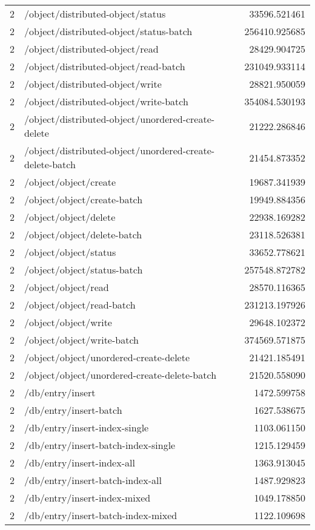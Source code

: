 \begin{longtable}{rlr}
2 & /object/distributed-object/status & 33596.521461 \\
2 & /object/distributed-object/status-batch & 256410.925685 \\
2 & /object/distributed-object/read & 28429.904725 \\
2 & /object/distributed-object/read-batch & 231049.933114 \\
2 & /object/distributed-object/write & 28821.950059 \\
2 & /object/distributed-object/write-batch & 354084.530193 \\
2 & /object/distributed-object/unordered-create-delete & 21222.286846 \\
2 & /object/distributed-object/unordered-create-delete-batch & 21454.873352 \\
2 & /object/object/create & 19687.341939 \\
2 & /object/object/create-batch & 19949.884356 \\
2 & /object/object/delete & 22938.169282 \\
2 & /object/object/delete-batch & 23118.526381 \\
2 & /object/object/status & 33652.778621 \\
2 & /object/object/status-batch & 257548.872782 \\
2 & /object/object/read & 28570.116365 \\
2 & /object/object/read-batch & 231213.197926 \\
2 & /object/object/write & 29648.102372 \\
2 & /object/object/write-batch & 374569.571875 \\
2 & /object/object/unordered-create-delete & 21421.185491 \\
2 & /object/object/unordered-create-delete-batch & 21520.558090 \\
2 & /db/entry/insert & 1472.599758 \\
2 & /db/entry/insert-batch & 1627.538675 \\
2 & /db/entry/insert-index-single & 1103.061150 \\
2 & /db/entry/insert-batch-index-single & 1215.129459 \\
2 & /db/entry/insert-index-all & 1363.913045 \\
2 & /db/entry/insert-batch-index-all & 1487.929823 \\
2 & /db/entry/insert-index-mixed & 1049.178850 \\
2 & /db/entry/insert-batch-index-mixed & 1122.109698 \\

\end{longtable}
